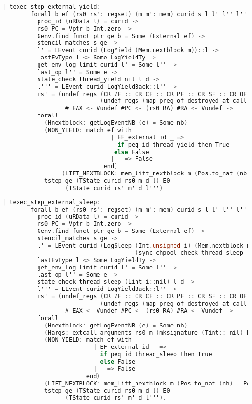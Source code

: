 \begin{lstlisting}[language=C]
    | texec_step_external_yield:
        forall b ef (rs0 rs': regset) (m m': mem) curid s l l' l'' l''' nb d e,
          proc_id (uRData l) = curid ->
          rs0 PC = Vptr b Int.zero ->
          Genv.find_funct_ptr ge b = Some (External ef) ->
          stencil_matches s ge ->
          l' = LEvent curid (LogYield (Mem.nextblock m))::l ->
          lastEvType l <> Some LogYieldTy ->
          get_env_log limit curid l' = Some l'' ->
          last_op l'' = Some e ->
          state_check thread_yield nil l d ->
          l''' = LEvent curid LogYieldBack::l'' ->
          rs' = (undef_regs (CR ZF :: CR CF :: CR PF :: CR SF :: CR OF :: nil)
                            (undef_regs (map preg_of destroyed_at_call) rs0)) 
                  # EAX <- Vundef #PC <- (rs0 RA) #RA <- Vundef ->
          forall
            (Hnextblock: getLogEventNB (e) = Some nb)
            (NON_YIELD: match ef with
                               | EF_external id _ => 
                                 if peq id thread_yield then True
                                else False
                               | _ => False
                             end)
                 (LIFT_NEXTBLOCK: mem_lift_nextblock m (Pos.to_nat (nb) - Pos.to_nat(Mem.nextblock m) % nat) = m'),
            tstep ge (TState curid rs0 m d l) E0
                  (TState curid rs' m' d l''')
\end{lstlisting}

\begin{lstlisting}[language=C]
    | texec_step_external_sleep:
        forall b ef (rs0 rs': regset) (m m': mem) curid s l l' l'' l''' nb d e i,
          proc_id (uRData l) = curid ->
          rs0 PC = Vptr b Int.zero ->
          Genv.find_funct_ptr ge b = Some (External ef) ->
          stencil_matches s ge ->
          l' = LEvent curid (LogSleep (Int.unsigned i) (Mem.nextblock m)
                                      (sync_chpool_check thread_sleep ((Lint i)::nil) (uRData l) d))::l ->
          lastEvType l <> Some LogYieldTy ->
          get_env_log limit curid l' = Some l'' ->
          last_op l'' = Some e ->
          state_check thread_sleep (Lint i::nil) l d ->
          l''' = LEvent curid LogYieldBack::l'' ->
          rs' = (undef_regs (CR ZF :: CR CF :: CR PF :: CR SF :: CR OF :: nil)
                            (undef_regs (map preg_of destroyed_at_call) rs0)) 
                  # EAX <- Vundef #PC <- (rs0 RA) #RA <- Vundef ->
          forall
            (Hnextblock: getLogEventNB (e) = Some nb)
            (Hargs: extcall_arguments rs0 m (mksignature (Tint:: nil) None cc_default) (Vint i:: nil))
            (NON_YIELD: match ef with
                          | EF_external id _ => 
                            if peq id thread_sleep then True
                            else False
                          | _ => False
                        end)
            (LIFT_NEXTBLOCK: mem_lift_nextblock m (Pos.to_nat (nb) - Pos.to_nat (Mem.nextblock m) % nat) = m'),
            tstep ge (TState curid rs0 m d l) E0
                  (TState curid rs' m' d l''').
\end{lstlisting}

